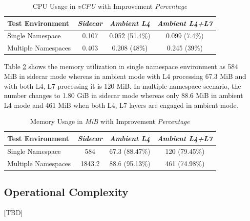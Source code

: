 \begin{table}[ht!]
  \centering
  \begin{tabular}{ |l|c|c|c|}
    \hline
    \textbf{Test Environment} & \textbf{\textit{Sidecar}} & \textbf{\textit{Ambient L4}} & \textbf{\textit{Ambient L4+L7}} \\ \hline
    Single Namespace & 0.107 & 0.052 (51.4\%) & 0.099 (7.4\%) \\ \hline
    Multiple Namespaces & 0.403 & 0.208 (48\%) & 0.245 (39\%) \\ \hline
  \end{tabular}
  \caption{CPU Usage in \textit{vCPU} with Improvement \textit{Percentage}}
  \label{cpuUsageTable}
\end{table}

Table \ref{memoryUsageTable} shows the memory utilization in single namespace environment as 584 MiB in sidecar mode whereas in ambient mode with L4 processing 67.3 MiB and with both L4, L7 processing it is 120 MiB. In multiple namespace scenario, the number changes to 1.80 GiB in sidecar mode whereas only 88.6 MiB in ambient L4 mode and 461 MiB when both L4, L7 layers are engaged in ambient mode.

\begin{table}[ht!]
  \centering
  \begin{tabular}{ |l|c|c|c| }
    \hline
    \textbf{Test Environment} & \textbf{\textit{Sidecar}} & \textbf{\textit{Ambient L4}} & \textbf{\textit{Ambient L4+L7}} \\ \hline
    Single Namespace & 584 & 67.3 (88.47\%) & 120 (79.45\%) \\ \hline
    Multiple Namespaces & 1843.2  & 88.6 (95.13\%) & 461 (74.98\%) \\ \hline
  \end{tabular}
  \caption{Memory Usage in \textit{MiB} with Improvement \textit{Percentage}}
  \label{memoryUsageTable}
\end{table}


\subsection{Operational Complexity}
[TBD]
